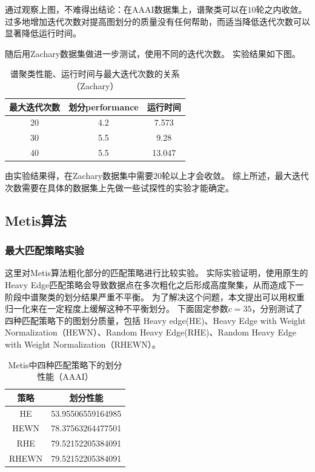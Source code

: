 通过观察上图，不难得出结论：在AAAI数据集上，谱聚类可以在$10$轮之内收敛。
过多地增加迭代次数对提高图划分的质量没有任何帮助，而适当降低迭代次数可以显著降低运行时间。

随后用Zachary数据集做进一步测试，使用不同的迭代次数。
实验结果如下图。

\begin{table}[htbp]
    \centering
    \begin{tabular}{ccc}
        \hline
    最大迭代次数 &划分performance      &运行时间 \\
        \hline
    20          &4.2                  &7.573 \\
    30          &5.5                   &9.28 \\
    40          &5.5                  &13.047 \\
        \hline
    \end{tabular}
    \caption{谱聚类性能、运行时间与最大迭代次数的关系（Zachary）}
\end{table}

由实验结果得，在Zachary数据集中需要$20$轮以上才会收敛。
综上所述，最大迭代次数需要在具体的数据集上先做一些试探性的实验才能确定。

\subsection{Metis算法}

\subsubsection{最大匹配策略实验}

这里对Metis算法粗化部分的匹配策略进行比较实验。
实际实验证明，使用原生的Heavy Edge匹配策略会导致数据点在多次粗化之后形成高度聚集，从而造成下一阶段中谱聚类的划分结果严重不平衡。
为了解决这个问题，本文提出可以用权重归一化来在一定程度上缓解这种不平衡划分。
下面固定参数$c=35$，分别测试了四种匹配策略下的图划分质量，包括
Heavy edge(HE)、Heavy Edge with Weight Normalization（HEWN）、Random Heavy Edge(RHE)、Random Heavy Edge with Weight Normalization（RHEWN）。

\begin{table}[htbp]
    \centering
    \begin{tabular}{cc}
        \hline
        策略        &划分性能\\
        \hline
        HE &53.95506559164985 \\
        HEWN &78.37563264477501 \\
        RHE &79.52152205384091 \\
        RHEWN &79.52152205384091 \\
        \hline
    \end{tabular}
    \caption{Metis中四种匹配策略下的划分性能（AAAI）}
\end{table}

